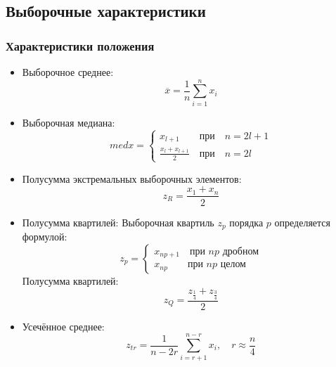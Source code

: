 \documentclass[12pt,a4paper]{article}
\begin{document}
	 	\subsection{Выборочные характеристики}
	 		\subsubsection{Характеристики положения}
	 			\begin{itemize}
	 				\item Выборочное среднее:
	 				\begin{equation}\label{mean}
	 					\overline{x}=\frac{1}{n}\sum_{i=1}^{n}x_i
	 				\end{equation}
 				
 					\item Выборочная медиана:
 					\begin{equation}\label{median}
 						med x=
 						\left\{
	 						\begin{array}{l}
								x_{l+1} \qquad \text{при} \quad n=2l+1 \\
	 							\frac{x_l+x_{l+1}}{2} \quad \text{при} \quad n=2l
 							\end{array}
 						\right.
 					\end{equation}
 				
 					\item Полусумма экстремальных выборочных элементов:
 					\begin{equation}\label{half_sum_ext}
 						z_R=\frac{x_1+x_n}{2}
 					\end{equation}
 				
 					\item Полусумма квартилей:
 						\subitem Выборочная квартиль $z_p$ порядка $p$ определяется формулой:
		 					\begin{equation}\label{half_sum_quart}
								z_p=
								\left\{
								\begin{array}{l}
									x_{np+1} \quad \text{при } np \text{ дробном} \\
									x_{np} \qquad \text{при } np \text{ целом}
								\end{array}
								\right.
		 					\end{equation}
 						\subitem Полусумма квартилей:
 							\begin{equation}
 								z_Q=\frac{z_{\frac{1}{4}}+z_{\frac{3}{4}}}{2}
	 						\end{equation}
 					
 					\item Усечённое среднее:
 						\begin{equation}\label{trunc_mean}
 							z_{tr}=\frac{1}{n-2r}\sum_{i=r+1}^{n-r}x_i,\quad r\approx\frac{n}{4}
 						\end{equation}
	 			\end{itemize}
\end{document}
